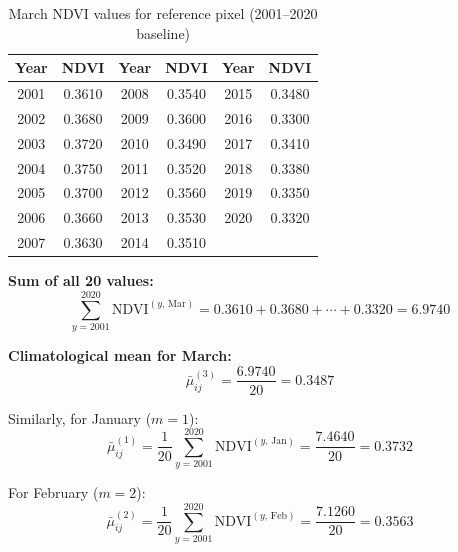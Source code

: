 \documentclass[12pt, a4paper]{article}
\begin{document}
\begin{table}[H]
\centering
\caption{March NDVI values for reference pixel (2001--2020 baseline)}
\label{tab:march_values}
\small
\begin{tabular}{@{}cccccc@{}}
\toprule
\textbf{Year} & \textbf{NDVI} &
\textbf{Year} & \textbf{NDVI} &
\textbf{Year} & \textbf{NDVI} \\
\midrule
2001 & 0.3610 & 2008 & 0.3540 & 2015 & 0.3480 \\
2002 & 0.3680 & 2009 & 0.3600 & 2016 & 0.3300 \\
2003 & 0.3720 & 2010 & 0.3490 & 2017 & 0.3410 \\
2004 & 0.3750 & 2011 & 0.3520 & 2018 & 0.3380 \\
2005 & 0.3700 & 2012 & 0.3560 & 2019 & 0.3350 \\
2006 & 0.3660 & 2013 & 0.3530 & 2020 & 0.3320 \\
2007 & 0.3630 & 2014 & 0.3510 & & \\
\bottomrule
\end{tabular}
\end{table}

\textbf{Sum of all 20 values:}
\begin{equation}
  \sum_{y=2001}^{2020} \mathrm{NDVI}^{(y,\,\mathrm{Mar})} =
  0.3610 + 0.3680 + \cdots + 0.3320 = 6.9740
  \label{eq:march_sum}
\end{equation}

\textbf{Climatological mean for March:}
\begin{equation}
  \bar{\mu}_{ij}^{(3)} =
  \frac{6.9740}{20} =
  \boxed{0.3487}
  \label{eq:clim_march}
\end{equation}

Similarly, for January ($m = 1$):
\begin{equation}
  \bar{\mu}_{ij}^{(1)} =
  \frac{1}{20}\sum_{y=2001}^{2020} \mathrm{NDVI}^{(y,\,\mathrm{Jan})}
  = \frac{7.4640}{20} = \boxed{0.3732}
  \label{eq:clim_jan}
\end{equation}

For February ($m = 2$):
\begin{equation}
  \bar{\mu}_{ij}^{(2)} =
  \frac{1}{20}\sum_{y=2001}^{2020} \mathrm{NDVI}^{(y,\,\mathrm{Feb})}
  = \frac{7.1260}{20} = \boxed{0.3563}
  \label{eq:clim_feb}
\end{equation}
\end{document}
